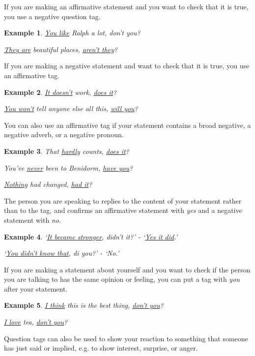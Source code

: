\documentclass[oneside]{book}
\numberwithin{equation}{section}
\newtheorem{example}{Example}[section]
\begin{document}
%
If you are making an affirmative statement and you want to check that it is true, you use a negative question tag.
\begin{example}
    \underline{You like} Ralph a lot, don't you?
    
    \underline{They are} beautiful places, \underline{aren't they}?
\end{example}
If you are making a negative statement and want to check that it is true, you use an affirmative tag.
\begin{example}
    \underline{It doesn't} work, \underline{does it}?
    
    \underline{You won't} tell anyone else all this, \underline{will you}?
\end{example}
You can also use an affirmative tag if your statement contains a broad negative, a negative adverb, or a negative pronoun.
\begin{example}
    That \underline{hardly} counts, \underline{does it}?
    
    You've \underline{never} been to Benidorm, \underline{have you}?
    
    \underline{Nothing} had changed, \underline{had it}?
\end{example}
%
\noindent{} The person you are speaking to replies to the content of your statement rather than to the tag, and confirms an affirmative statement with \textit{yes} and a negative statement with \textit{no}.
\begin{example}
    `\underline{It became stronger}, didn't it?' - `\underline{Yes it did}.'
    
    `\underline{You didn't know that}, di you?' - `No.'
\end{example}
%
\noindent{} If you are making a statement about yourself and you want to check if the person you are talking to has the same opinion or feeling, you can put a tag with \textit{you} after your statement.
\begin{example}
    \underline{I think} this is the best thing, \underline{don't you}?
    
    \underline{I love} tea, \underline{don't you}?
\end{example}
Question tags can also be used to show your reaction to something that someone has just said or implied, e.g. to show interest, surprise, or anger.
\end{document}
